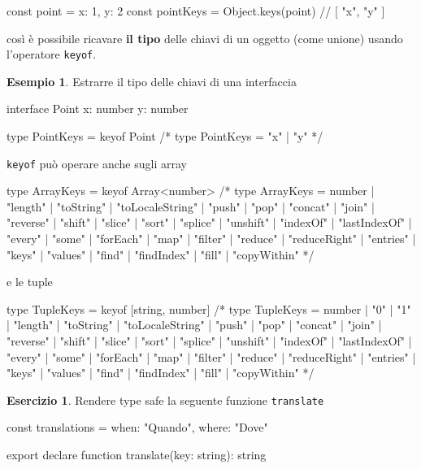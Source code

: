 \documentclass[12pt]{article}
\theoremstyle{definition}
\newtheorem{example}{Esempio}[subsection]
\newtheorem{exercise}{Esercizio}[subsection]
\newenvironment{code}
  {\vspace{0.5cm} \VerbatimEnvironment\begin{typescriptcode}}
  {\end{typescriptcode} \vspace{0.2cm}}
\begin{document}
\begin{code}
const point = { x: 1, y: 2 }
const pointKeys = Object.keys(point)
// [ "x", "y" ]
\end{code}

così è possibile ricavare \textbf{il tipo} delle chiavi di un oggetto (come unione) usando l'operatore \texttt{keyof}.

\begin{example}
Estrarre il tipo delle chiavi di una interfaccia

\begin{code}
interface Point {
  x: number
  y: number
}

type PointKeys = keyof Point
/*
type PointKeys = "x" | "y"
*/
\end{code}

\texttt{keyof} può operare anche sugli array

\begin{code}
type ArrayKeys = keyof Array<number>
/*
type ArrayKeys = number | "length" | "toString" |
"toLocaleString" | "push" | "pop" | "concat" | "join" |
"reverse" | "shift" | "slice" | "sort" | "splice" |
"unshift" | "indexOf" | "lastIndexOf" | "every" | "some" |
"forEach" | "map" | "filter" | "reduce" | "reduceRight" |
"entries" | "keys" | "values" | "find" | "findIndex" |
"fill" | "copyWithin"
*/
\end{code}

e le tuple

\begin{code}
type TupleKeys = keyof [string, number]
/*
type TupleKeys = number | "0" | "1" | "length" | "toString" |
"toLocaleString" | "push" | "pop" | "concat" | "join" |
"reverse" | "shift" | "slice" | "sort" | "splice" |
"unshift" | "indexOf" | "lastIndexOf" | "every" |
"some" | "forEach" | "map" | "filter" | "reduce" |
"reduceRight" | "entries" | "keys" | "values" |
"find" | "findIndex" | "fill" | "copyWithin"
*/
\end{code}
\end{example}

\begin{exercise}
Rendere type safe la seguente funzione \texttt{translate}

\begin{code}
const translations = {
  when: "Quando",
  where: "Dove"
}

export declare function translate(key: string): string
\end{code}
\end{exercise}
\end{document}
